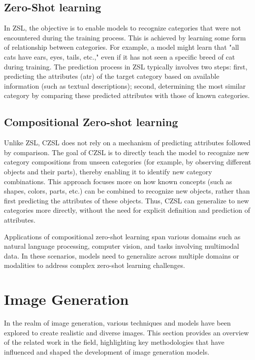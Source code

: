 \subsection{Zero-Shot learning}
In ZSL, the objective is to enable models to recognize categories that were not encountered during the training process. This is achieved by learning some form of relationship between categories. For example, a model might learn that "all cats have ears, eyes, tails, etc.," even if it has not seen a specific breed of cat during training. The prediction process in ZSL typically involves two steps: first, predicting the attributes (atr) of the target category based on available information (such as textual descriptions); second, determining the most similar category by comparing these predicted attributes with those of known categories.

\subsection{Compositional Zero-shot learning}
Unlike ZSL, CZSL does not rely on a mechanism of predicting attributes followed by comparison. The goal of CZSL is to directly teach the model to recognize new category compositions from unseen categories (for example, by observing different objects and their parts), thereby enabling it to identify new category combinations. This approach focuses more on how known concepts (such as shapes, colors, parts, etc.) can be combined to recognize new objects, rather than first predicting the attributes of these objects. Thus, CZSL can generalize to new categories more directly, without the need for explicit definition and prediction of attributes.

Applications of compositional zero-shot learning span various domains such as natural language processing, computer vision, and tasks involving multimodal data. In these scenarios, models need to generalize across multiple domains or modalities to address complex zero-shot learning challenges.

\section{Image Generation}
In the realm of image generation, various techniques and models have been explored to create realistic and diverse images. This section provides an overview of the related work in the field, highlighting key methodologies that have influenced and shaped the development of image generation models.

